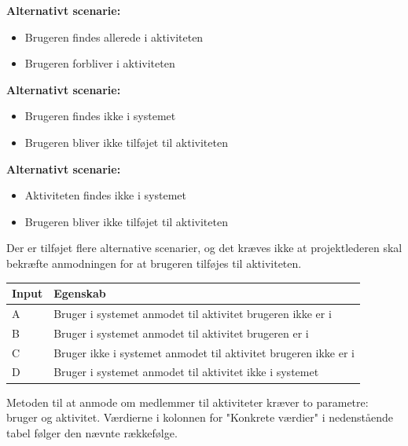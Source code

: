 \textbf{Alternativt scenarie:}
\begin{itemize}
    \item Brugeren findes allerede i aktiviteten
    \item Brugeren forbliver i aktiviteten
\end{itemize}

\textbf{Alternativt scenarie:}
\begin{itemize}
    \item Brugeren findes ikke i systemet
    \item Brugeren bliver ikke tilføjet til aktiviteten
\end{itemize}

\textbf{Alternativt scenarie:}
\begin{itemize}
    \item Aktiviteten findes ikke i systemet
    \item Brugeren bliver ikke tilføjet til aktiviteten
\end{itemize}

\vspace{1cm}

Der er tilføjet flere alternative scenarier, og det kræves ikke at projektlederen skal bekræfte anmodningen for at brugeren tilføjes til aktiviteten.

\begin{table}[H]
    \centering
    \begin{tabular}{|l|l|}
    \hline
    \textbf{Input} & \textbf{Egenskab}                                                        \\ \hline
    A     & Bruger i systemet anmodet til aktivitet brugeren ikke er i      \\ \hline
    B     & Bruger i systemet anmodet til aktivitet brugeren er i           \\ \hline
    C     & Bruger ikke i systemet anmodet til aktivitet brugeren ikke er i \\ \hline
    D     & Bruger i systemet anmodet til aktivitet ikke i systemet         \\ \hline
    \end{tabular}
\end{table}

Metoden til at anmode om medlemmer til aktiviteter kræver to parametre: bruger og aktivitet. Værdierne i kolonnen for "Konkrete værdier" i nedenstående tabel følger den nævnte rækkefølge.

